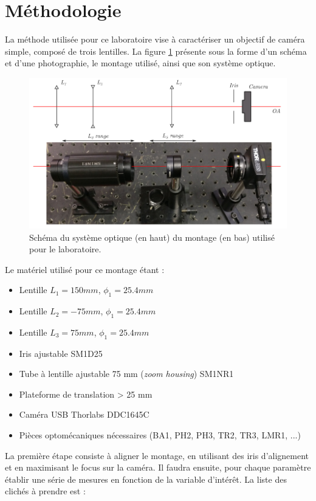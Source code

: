 \documentclass[11pt,letterpaper]{article}
\begin{document}
\section{Méthodologie}

La méthode utilisée pour ce laboratoire vise à caractériser un objectif de caméra simple, composé de trois lentilles. La figure \ref{montage} présente sous la forme d'un schéma et d'une photographie, le montage utilisé, ainsi que son système optique. 

\begin{figure}[H]
  \centering
  \includegraphics[scale=0.78]{Montage laboratoire 2.png}
  \caption{Schéma du système optique (en haut) du montage (en bas) utilisé pour le laboratoire.}
  \label{montage}
\end{figure}

Le matériel utilisé pour ce montage étant : 

\begin{itemize}
    \item Lentille $L_1 = 150 mm$, $\phi_1 = 25.4 mm$
    \item Lentille $L_2 = -75 mm$, $\phi_1 = 25.4 mm$
    \item Lentille $L_3 = 75 mm$, $\phi_1 = 25.4 mm$
    \item Iris ajustable SM1D25
    \item Tube à lentille ajustable 75 mm (\textit{zoom housing}) SM1NR1
    \item Plateforme de translation > 25 mm
    \item Caméra USB Thorlabs DDC1645C
    \item Pièces optomécaniques nécessaires (BA1, PH2, PH3, TR2, TR3, LMR1, ...)
\end{itemize}

La première étape consiste à aligner le montage, en utilisant des iris d'alignement et en maximisant le focus sur la caméra. Il faudra ensuite, pour chaque paramètre établir une série de mesures en fonction de la variable d'intérêt. La liste des clichés à prendre est : 
\end{document}
